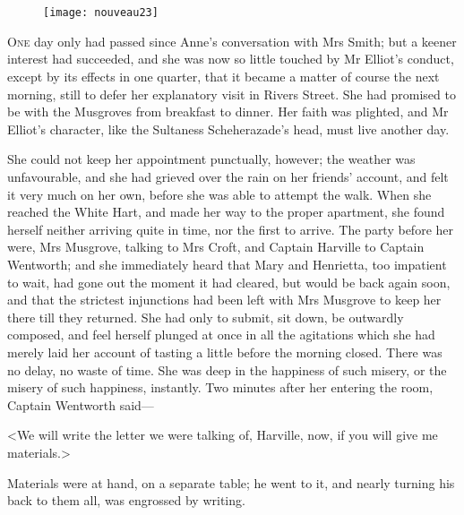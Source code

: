 \chapter[Chapter \thechapter]{}

\begin{figure}[t!]
\centering
\texttt{[image: nouveau23]}
\end{figure}

\lettrine[lraise=0.3]{O}{ne} day only had passed since Anne's conversation with Mrs Smith; but a keener interest had succeeded, and she was now so little touched by Mr Elliot's conduct, except by its effects in one quarter, that it became a matter of course the next morning, still to defer her explanatory visit in Rivers Street. She had promised to be with the Musgroves from breakfast to dinner. Her faith was plighted, and Mr Elliot's character, like the Sultaness Scheherazade's head, must live another day.

She could not keep her appointment punctually, however; the weather was unfavourable, and she had grieved over the rain on her friends' account, and felt it very much on her own, before she was able to attempt the walk. When she reached the White Hart, and made her way to the proper apartment, she found herself neither arriving quite in time, nor the first to arrive. The party before her were, Mrs Musgrove, talking to Mrs Croft, and Captain Harville to Captain Wentworth; and she immediately heard that Mary and Henrietta, too impatient to wait, had gone out the moment it had cleared, but would be back again soon, and that the strictest injunctions had been left with Mrs Musgrove to keep her there till they returned. She had only to submit, sit down, be outwardly composed, and feel herself plunged at once in all the agitations which she had merely laid her account of tasting a little before the morning closed. There was no delay, no waste of time. She was deep in the happiness of such misery, or the misery of such happiness, instantly. Two minutes after her entering the room, Captain Wentworth said—

<We will write the letter we were talking of, Harville, now, if you will give me materials.>

Materials were at hand, on a separate table; he went to it, and nearly turning his back to them all, was engrossed by writing.

